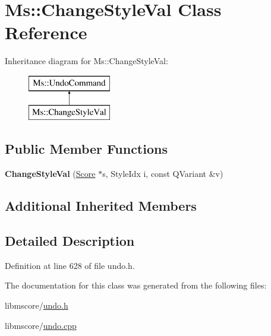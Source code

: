 \hypertarget{class_ms_1_1_change_style_val}{}\section{Ms\+:\+:Change\+Style\+Val Class Reference}
\label{class_ms_1_1_change_style_val}
Inheritance diagram for Ms\+:\+:Change\+Style\+Val\+:\begin{figure}[H]
\begin{center}
\leavevmode
\includegraphics[height=2.000000cm]{class_ms_1_1_change_style_val}
\end{center}
\end{figure}
\subsection*{Public Member Functions}
\begin{DoxyCompactItemize}
\item 
\mbox{\label{class_ms_1_1_change_style_val_a7e8f6be972e74d5e1e4d8029a830e3b6}} 
{\bfseries Change\+Style\+Val} (\hyperlink{class_ms_1_1_score}{Score} $\ast$s, Style\+Idx i, const Q\+Variant \&v)
\end{DoxyCompactItemize}
\subsection*{Additional Inherited Members}


\subsection{Detailed Description}


Definition at line 628 of file undo.\+h.



The documentation for this class was generated from the following files\+:\begin{DoxyCompactItemize}
\item 
libmscore/\hyperlink{undo_8h}{undo.\+h}\item 
libmscore/\hyperlink{undo_8cpp}{undo.\+cpp}\end{DoxyCompactItemize}
